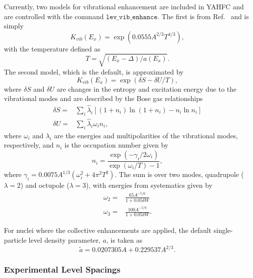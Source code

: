 \documentclass[
10pt,
showpacs,preprintnumbers,footinbib,
amsfonts,amsmath,amssymb,
aps,
prc,twocolumn,groupedaddress,superscriptaddress,
showkeys,
nofootinbib
]{revtex4-1}
\begin{document}
Currently, two models for vibrational enhancement are included in YAHFC and are controlled with the command ${\texttt{lev\_vib\_enhance}}$.  The first is from Ref.~\cite{Iljinov:1992} and is simply
\begin{equation}
K_{vib}(E_x) = \exp\left ( 0.0555A^{2/3}T^{4/3}\right ),
\end{equation}
with the temperature defined as 
\begin{equation}
T = \sqrt{(E_x - \Delta)/a(E_x)}.
\end{equation}
The second model, which is the default, is approximated by~\cite{Capote:2009}
\begin{equation}
K_{vib}(E_x) = \exp(\delta S - \delta U/T),
\end{equation}
where $\delta S$ and $\delta U$ are changes in the entropy and excitation energy due to the vibrational modes and are described by the Bose gas relationships
\begin{align}
\delta S = & \sum_i \hat \lambda_i \left [(1+n_i)\ln(1+n_i)-n_i\ln n_i \right ]\\
\delta U = & \sum_i \hat \lambda_i \omega_i n_i,
\end{align}
where $\omega_i$ and $\lambda_i$ are the energies and multipolarities of the vibrational modes, respectively, and $n_i$ is the occupation number given by
\begin{equation}
n_i = \frac{\exp(-\gamma_i/2\omega_i)}{\exp(\omega_i/T)-1},
\end{equation}
where $\gamma_i = 0.0075A^{1/3}(\omega_i^2+4\pi^2T^2)$. The sum is over two modes, quadrupole ($\lambda = 2$) and octupole ($\lambda=3$), with energies from systematics given by
\begin{align}
\omega_2 =& \frac{65A^{-5/6}}{1+0.05\delta W}\\
\omega_3 =& \frac{100A^{-5/6}}{1+0.05\delta W}.
\end{align}

For nuclei where the collective enhancements are applied, the default single-particle level density parameter, $a$, is taken as~\cite{TALYS}
\begin{equation}
\tilde a = 0.0207305 A + 0.229537 A^{2/3}.
\end{equation}

\subsubsection{Experimental Level Spacings}
\end{document}
